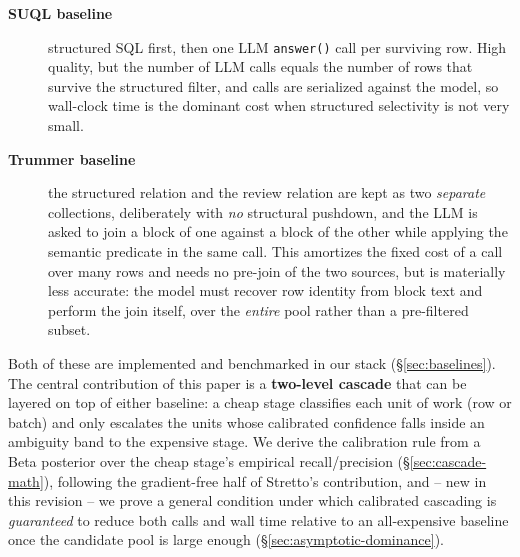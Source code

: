 \documentclass[sigconf,natbib=false]{acmart}
\begin{document}
\begin{description}
\item[\textbf{SUQL baseline}] structured SQL first, then one LLM \texttt{answer()} call per surviving row. High quality, but the number of LLM calls equals the number of rows that survive the structured filter, and calls are serialized against the model, so wall-clock time is the dominant cost when structured selectivity is not very small.
\item[\textbf{Trummer baseline}] the structured relation and the review relation are kept as two \emph{separate} collections, deliberately with \emph{no} structural pushdown, and the LLM is asked to join a block of one against a block of the other while applying the semantic predicate in the same call. This amortizes the fixed cost of a call over many rows and needs no pre-join of the two sources, but is materially less accurate: the model must recover row identity from block text and perform the join itself, over the \emph{entire} pool rather than a pre-filtered subset.
\end{description}

Both of these are implemented and benchmarked in our stack (\S\ref{sec:baselines}). The central contribution of this paper is a \textbf{two-level cascade} that can be layered on top of either baseline: a cheap stage classifies each unit of work (row or batch) and only escalates the units whose calibrated confidence falls inside an ambiguity band to the expensive stage. We derive the calibration rule from a Beta posterior over the cheap stage's empirical recall/precision (\S\ref{sec:cascade-math}), following the gradient-free half of Stretto's contribution, and -- new in this revision -- we prove a general condition under which calibrated cascading is \emph{guaranteed} to reduce both calls and wall time relative to an all-expensive baseline once the candidate pool is large enough (\S\ref{sec:asymptotic-dominance}).
\end{document}
